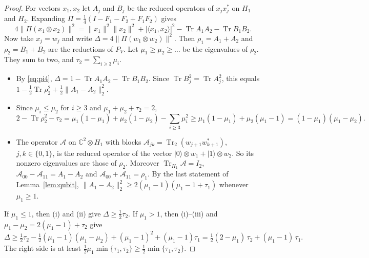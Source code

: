 \documentclass[11pt]{article}
\theoremstyle{remark}
\newcommand{\Tr}{\operatorname{Tr}}
\newcommand{\norm}[1]{\lVert #1\rVert}
\begin{document}
\begin{proof}
For vectors $x_1,x_2$ let $A_j$ and $B_j$ be the reduced operators of $x_jx_j^*$ on $H_1$ and $H_2$. Expanding
$\Pi=\frac14(I-F_1-F_2+F_1F_2)$ gives
\begin{equation}\label{eq:pi4}
4\norm{\Pi(x_1\otimes x_2)}^2=\norm{x_1}^2\norm{x_2}^2+|\langle x_1,x_2\rangle|^2-\Tr A_1A_2-\Tr B_1B_2 .
\end{equation}
Now take $x_j=w_j$ and write $\Delta=4\norm{\Pi(w_1\otimes w_2)}^2$. Then $\rho_1=A_1+A_2$ and $\rho_2=B_1+B_2$ are the
reductions of $P_V$. Let $\mu_1\ge\mu_2\ge\dots$ be the eigenvalues of $\rho_2$. They sum to two, and
$\tau_2=\sum_{i\ge3}\mu_i$.
\begin{itemize}
\item[(i)] By \eqref{eq:pi4}, $\Delta=1-\Tr A_1A_2-\Tr B_1B_2$. Since $\Tr B_j^2=\Tr A_j^2$, this equals
$1-\frac12\Tr\rho_2^2+\frac12\norm{A_1-A_2}_2^2$.
\item[(ii)] Since $\mu_i\le\mu_2$ for $i\ge3$ and $\mu_1+\mu_2+\tau_2=2$,
\[
2-\Tr\rho_2^2-\tau_2=\mu_1(1-\mu_1)+\mu_2(1-\mu_2)-\sum_{i\ge3}\mu_i^2\ge\mu_1(1-\mu_1)+\mu_2(\mu_1-1)
=(1-\mu_1)(\mu_1-\mu_2).
\]
\item[(iii)] The operator $\mathcal A$ on $\mathbb C^2\otimes H_1$ with blocks
$\mathcal A_{jk}=\Tr_2(w_{j+1}w_{k+1}^*)$, $j,k\in\{0,1\}$, is the reduced operator of the vector
$|0\rangle\otimes w_1+|1\rangle\otimes w_2$. So its nonzero eigenvalues are those of $\rho_2$.
Moreover $\Tr_{H_1}\mathcal A=I_2$, $\mathcal A_{00}-\mathcal A_{11}=A_1-A_2$ and
$\mathcal A_{00}+\mathcal A_{11}=\rho_1$. By the last statement of Lemma~\ref{lem:qubit},
$\norm{A_1-A_2}_2^2\ge2(\mu_1-1)(\mu_1-1+\tau_1)$ whenever $\mu_1\ge1$.
\end{itemize}
If $\mu_1\le1$, then (i) and (ii) give $\Delta\ge\frac12\tau_2$. If $\mu_1>1$, then (i)--(iii) and
$\mu_1-\mu_2=2(\mu_1-1)+\tau_2$ give
\[
\Delta\ge\tfrac12\tau_2-\tfrac12(\mu_1-1)(\mu_1-\mu_2)+(\mu_1-1)^2+(\mu_1-1)\tau_1
=\tfrac12(2-\mu_1)\,\tau_2+(\mu_1-1)\,\tau_1 .
\]
The right side is at least $\frac12\mu_1\min\{\tau_1,\tau_2\}\ge\frac12\min\{\tau_1,\tau_2\}$.
\end{proof}
\end{document}
